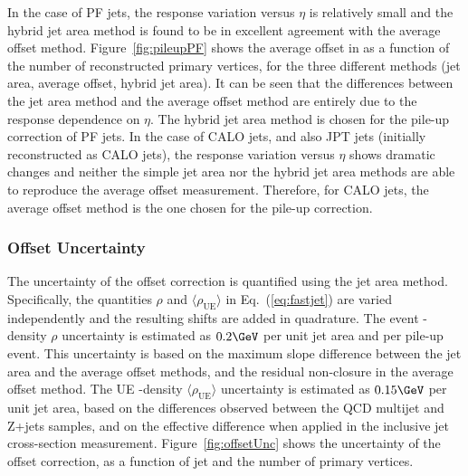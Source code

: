In the case of PF jets, the response variation versus $\eta$ is relatively small and the hybrid jet area method is found to be in excellent agreement with the average offset method. Figure~\ref{fig:pileupPF} shows the average offset in \pt as a function of the number of reconstructed primary vertices, for the three different methods (jet area, average offset, hybrid jet area). It can be seen that the differences between the jet area method and the average offset method are entirely due to the response dependence on $\eta$. The hybrid jet area method is chosen for the pile-up correction of PF jets. In the case of CALO jets, and also JPT jets (initially reconstructed as CALO jets), the response variation versus $\eta$ shows dramatic changes and neither the simple jet area nor the hybrid jet area methods are able to reproduce the average offset measurement. Therefore, for CALO jets, the average offset method is the one chosen for the pile-up correction.

\subsubsection{Offset Uncertainty}\label{sec:offset_unc}

The uncertainty of the offset correction is quantified using the jet area method. Specifically, the quantities $\rho$ and $\langle\rho_\text{UE}\rangle$ in Eq.~(\ref{eq:fastjet}) are varied independently and the resulting shifts are added in quadrature. The event \pt-density $\rho$ uncertainty is estimated as $0.2\GeV$ per unit jet area and per pile-up event. This uncertainty is based on the maximum slope difference between the jet area and the average offset methods, and the residual non-closure in the average offset method. The UE \pt-density $\langle\rho_\text{UE}\rangle$ uncertainty is estimated as $0.15\GeV$ per unit jet area, based on the differences observed between the QCD multijet and Z+jets samples, and on the effective difference when applied in the inclusive jet cross-section measurement. Figure~\ref{fig:offsetUnc} shows the uncertainty of the offset correction, as a function of jet \pt and the number of primary vertices.

